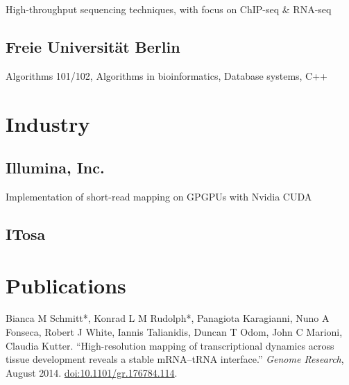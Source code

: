 \documentclass{klmr-cv}
\newcommand*\cpp{C++}
\begin{document}
\date{2013--2015}
\item{}
\item{High-throughput sequencing techniques, with focus on ChIP-seq \& RNA-seq}

\subsection{Freie Universität Berlin}

\date{2008--2011}
\item{}
\item{Algorithms 101/102, Algorithms in bioinformatics, Database systems, \cpp}

\section{Industry}

\subsection{Illumina, Inc.}

\date{Oct 2008--Feb 2009}
\item{}
\item{Implementation of short-read mapping on GPGPUs with Nvidia CUDA}

\subsection{ITosa}

\date{Jan 2007--Jan 2008}
\item{}

\section{Publications}


\begin{enumerate}
    \listitem Bianca M Schmitt*, Konrad L M Rudolph*, Panagiota Karagianni,
        Nuno A Fonseca, Robert J White, Iannis Talianidis, Duncan T Odom,
        John C Marioni, Claudia Kutter. “High-resolution mapping of
        transcriptional dynamics across tissue development reveals a stable
        mRNA--tRNA interface.” \textit{Genome Research}, August 2014.
        \href{http://dx.doi.org/10.1101/gr.176784.114}{doi:10.1101/gr.176784.114}.
\end{enumerate}
\end{document}
